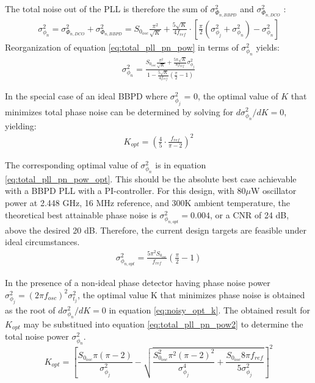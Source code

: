 			The total noise out of the PLL is therefore the sum of $\sigma_{\Phi_{n,BBPD}}^2$ and $\sigma_{\Phi_{n,DCO}}^2$ : 
			\begin{align} \label{eq:total_pll_pn_pow}
				\sigma^2_{\phi_n}  = \sigma_{\Phi_{n,DCO}}^2 + \sigma_{\Phi_{n,BBPD}}^2 =
				S_{0_{osc}}\frac{\pi^2}{\sqrt{K}} +
				\frac{5\sqrt{K}}{4f_{ref}}\cdot\left[\frac{\pi}{2}(\sigma^2_{\phi_j} +
				\sigma^2_{\phi_n})-\sigma^2_{\phi_n}\right] 
			\end{align} 
			Reorganization of equation \ref{eq:total_pll_pn_pow} in terms of $\sigma^2_{\phi_n}$ yields:
			\begin{align} \label{eq:total_pll_pn_pow2} \sigma^2_{\phi_n}  =
				\frac{S_{0_{osc}}\frac{\pi^2}{\sqrt{K}} +
				\frac{5\pi\sqrt{K}}{8f_{ref}}\sigma^2_{\phi_j}}{1-\frac{5\sqrt{K}}{4f_{ref}}(\frac{\pi}{2}-1)}
			\end{align}			 

			In the special case of an ideal BBPD where $\sigma^2_{\phi_j}$ = 0, the optimal value of $K$ that minimizes total phase noise can be determined by solving for $d\sigma^2_{\phi_n}/dK = 0$, yielding:
			\begin{align} \label{eq:k_opt} K_{opt} =
				\left(\frac{4}{5}\cdot\frac{f_{ref}}{\pi-2}\right)^2 
			\end{align}	 

			The corresponding optimal value of $\sigma^2_{\phi_n} $ is in equation \ref{eq:total_pll_pn_pow_opt}. This should be the absolute best case achievable with a BBPD PLL with a PI-controller. For this design, with 80$\mu$W oscillator power at 2.448 GHz, 16 MHz reference, and 300K ambient temperature, the theoretical best attainable phase noise is $\sigma^2_{\phi_{n,opt}}=0.004$, or a CNR of 24 dB, above the desired 20 dB. Therefore, the current design targets are feasible under ideal circumstances. 
			\begin{align} \label{eq:total_pll_pn_pow_opt} 
				\sigma^2_{\phi_{n,opt}}  =
				\frac{5\pi^2S_{0_{osc}}}{f_{ref}}\left(\frac{\pi}{2}-1\right) 
			\end{align}	 

			In the presence of a non-ideal phase detector having phase noise power $\sigma^2_{\phi_j} = (2\pi f_{osc})^2\sigma^2_{t_j}$, the optimal value K that minimizes phase noise is obtained as the root of $d\sigma^2_{\phi_n}/dK = 0$ in equation \ref{eq:noisy_opt_k}. The obtained result for $K_{opt}$ may be substitued into equation \ref{eq:total_pll_pn_pow2} to determine the total noise power $\sigma^2_{\phi_n}$. 
			\begin{equation}\label{eq:noisy_opt_k}
				K_{opt} = \left[\frac{S_{0_{osc}}\pi(\pi-2)}{\sigma^2_{\phi_j}} -
				\sqrt{\frac{S_{0_{osc}}^2\pi^2(\pi-2)^2}{\sigma^4_{\phi_j}} +
				\frac{S_{0_{osc}}8\pi f_{ref}}{5\sigma^2_{\phi_j}}} \right]^2 
			\end{equation}

